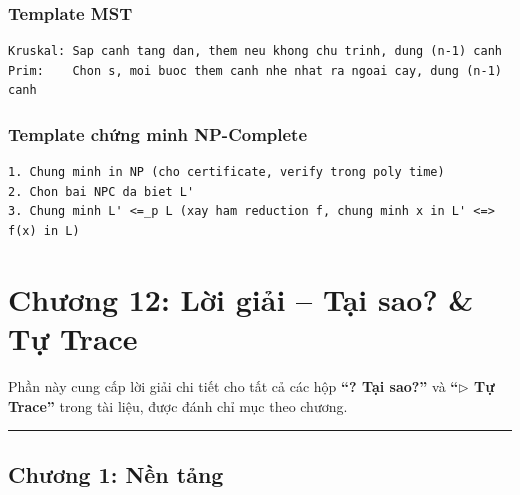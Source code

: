 \documentclass[10pt]{article}
\begin{document}
\subsubsection{Template MST}\label{template-mst}

\begin{tcolorbox}[colback=gray!8, colframe=gray!50, boxrule=0.5pt, arc=2pt,
  left=6pt, right=6pt, top=4pt, bottom=4pt,
  title={\small\textbf{Pseudocode 23: Template MST}}]
\begin{verbatim}
Kruskal: Sap canh tang dan, them neu khong chu trinh, dung (n-1) canh
Prim:    Chon s, moi buoc them canh nhe nhat ra ngoai cay, dung (n-1) canh
\end{verbatim}
\end{tcolorbox}

\subsubsection{Template chứng minh
NP-Complete}\label{template-chux1ee9ng-minh-np-complete}

\begin{tcolorbox}[colback=gray!8, colframe=gray!50, boxrule=0.5pt, arc=2pt,
  left=6pt, right=6pt, top=4pt, bottom=4pt,
  title={\small\textbf{Pseudocode 24: Template chứng minh NP-Complete}}]
\begin{verbatim}
1. Chung minh in NP (cho certificate, verify trong poly time)
2. Chon bai NPC da biet L'
3. Chung minh L' <=_p L (xay ham reduction f, chung minh x in L' <=> f(x) in L)
\end{verbatim}
\end{tcolorbox}

\newpage

\section{Chương 12: Lời giải -- Tại sao? \& Tự Trace}\label{loi-giai-tai-sao-va-tu-trace}

Phần này cung cấp lời giải chi tiết cho tất cả các hộp \textbf{``? Tại sao?''} và \textbf{``$\triangleright$ Tự Trace''} trong tài liệu, được đánh chỉ mục theo chương.

\begin{center}\rule{0.5\linewidth}{0.5pt}\end{center}

\subsection{Chương 1: Nền tảng}
\end{document}
